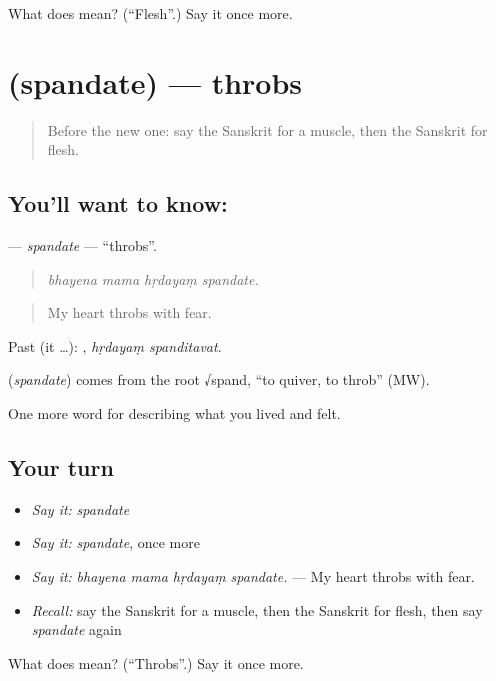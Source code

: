 \begin{tcolorbox}[breakable,colback=teal!4,colframe=teal!35!black,title={Before you move on}]
What does  mean? (\textquotedblleft{}Flesh\textquotedblright{}.) Say it once more.
\end{tcolorbox}
\section[\texorpdfstring{\sk{स्पन्दते} (spandate)}{स्पन्दते (spandate)}]{ (spandate) — throbs}

\label{lesson:SA-C474-spandate}



\begin{quote}
Before the new one: say the Sanskrit for a muscle, then the Sanskrit for flesh.
\end{quote}

\subsection*{You'll want to know: }
\textbf{} — \emph{spandate} — \textquotedblleft{}throbs\textquotedblright{}.

\begin{quote}
   
\end{quote}

\begin{quote}
\emph{bhayena mama hṛdayaṃ spandate.}
\end{quote}

\begin{quote}
My heart throbs with fear.
\end{quote}

Past (it …):  , \emph{hṛdayaṃ spanditavat}.

\begin{cousinweb}
\textbf{} (\emph{spandate}) comes from the root √spand, \textquotedblleft{}to quiver, to throb\textquotedblright{} (MW).
\end{cousinweb}

\begin{grammarlens}[title={What you've built}]
One more word for describing what you lived and felt.
\end{grammarlens}

\subsection*{Your turn}
\begin{itemize}
\raggedright
  \item \emph{Say it:} \emph{spandate}
  \item \emph{Say it:} \emph{spandate}, once more
  \item \emph{Say it:} \emph{bhayena mama hṛdayaṃ spandate.} — My heart throbs with fear.
  \item \emph{Recall:} say the Sanskrit for a muscle, then the Sanskrit for flesh, then say \emph{spandate} again
\end{itemize}

\begin{tcolorbox}[breakable,colback=teal!4,colframe=teal!35!black,title={Before you move on}]
What does  mean? (\textquotedblleft{}Throbs\textquotedblright{}.) Say it once more.
\end{tcolorbox}
